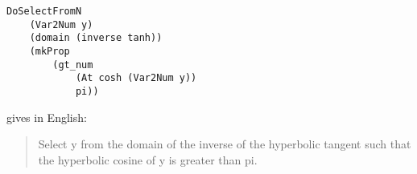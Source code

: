 \documentclass[adraft,copyright,creativecommons]{eptcs}
\begin{document}
\begin{lstlisting}
DoSelectFromN
	(Var2Num y)
	(domain (inverse tanh))
	(mkProp 
		(gt_num 
			(At cosh (Var2Num y))
			pi))	
\end{lstlisting}
gives in English:
\begin{quote}
Select y from the domain of the inverse of the hyperbolic tangent such that
the hyperbolic cosine of y is greater than pi.
\end{quote}







\nocite{*}


\end{document}

